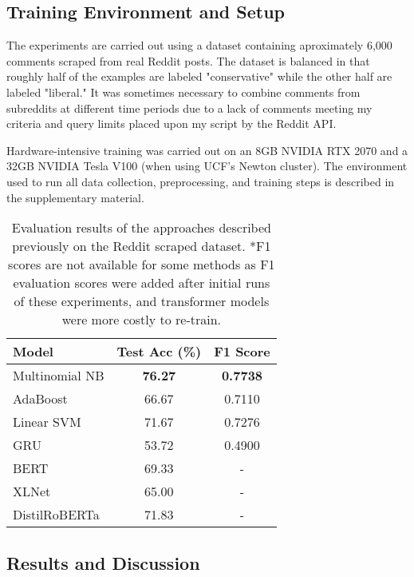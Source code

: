 \documentclass[11pt,a4paper]{article}
\begin{document}
\subsection{Training Environment and Setup}

The experiments are carried out using a dataset containing aproximately 6,000 comments scraped from real Reddit posts. The dataset is balanced in that roughly half of the examples are labeled "conservative" while the other half are labeled "liberal." It was sometimes necessary to combine comments from subreddits at different time periods due to a lack of comments meeting my criteria and query limits placed upon my script by the Reddit API.

Hardware-intensive training was carried out on an 8GB NVIDIA RTX 2070 and a 32GB NVIDIA Tesla V100 (when using UCF's Newton cluster). The environment used to run all data collection, preprocessing, and training steps is described in the supplementary material.

\begin{table}
\centering
\begin{tabular}{lcc}
\hline \textbf{Model} & \textbf{Test Acc (\%)}    & \textbf{F1 Score} \\ \hline
Multinomial NB      & \textbf{76.27}                        & \textbf{0.7738} \\
AdaBoost            & 66.67                                 & 0.7110 \\
Linear SVM          & 71.67                                 & 0.7276 \\
GRU                 & 53.72                                 & 0.4900 \\
BERT                & 69.33                                 & - \\
XLNet               & 65.00                                 & - \\
DistilRoBERTa       & 71.83                                 & - \\

\hline
\end{tabular}
\caption{Evaluation results of the approaches described previously on the Reddit scraped dataset. *F1 scores are not available for some methods as F1 evaluation scores were added after initial runs of these experiments, and transformer models were more costly to re-train.}
\label{table:results}
\end{table}

\subsection{Results and Discussion}
\end{document}
